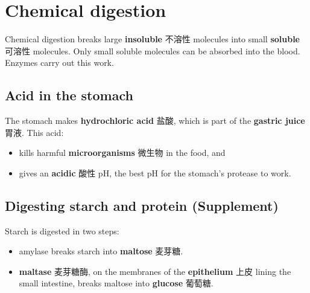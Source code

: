 \documentclass[11pt]{article}
\begin{document}
\section*{Chemical digestion}

Chemical digestion breaks large \textbf{insoluble} 不溶性 molecules into small \textbf{soluble} 可溶性 molecules. Only small soluble molecules can be absorbed into the blood. Enzymes carry out this work.

\begin{center}
\end{center}

\subsection*{Acid in the stomach}

The stomach makes \textbf{hydrochloric acid} 盐酸, which is part of the \textbf{gastric juice} 胃液. This acid:

\begin{itemize}
\item kills harmful \textbf{microorganisms} 微生物 in the food, and

\item gives an \textbf{acidic} 酸性 pH, the best pH for the stomach's protease to work.

\end{itemize}

\subsection*{Digesting starch and protein (Supplement)}

Starch is digested in two steps:

\begin{itemize}
\item amylase breaks starch into \textbf{maltose} 麦芽糖.

\item \textbf{maltase} 麦芽糖酶, on the membranes of the \textbf{epithelium} 上皮 lining the small intestine, breaks maltose into \textbf{glucose} 葡萄糖.

\end{itemize}
\end{document}
